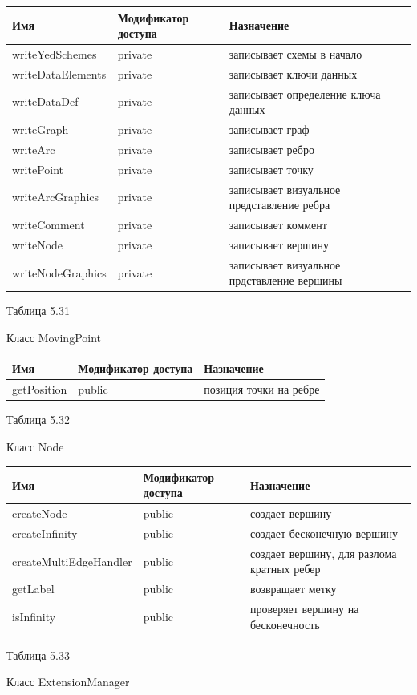 \documentclass{../TechDoc}
\begin{document}
	\begin{tabular}{|p{5cm}|p{5cm}|p{5cm}|}
		\hline
		\textbf{Имя} & \textbf{Модификатор доступа} & \textbf{Назначение} \\
		\hline
		writeYedSchemes& private& записывает схемы в начало\\
		\hline
		writeDataElements& private& записывает ключи данных\\
		\hline
		writeDataDef&private & записывает определение ключа данных \\
		\hline
		writeGraph&private & записывает граф\\
		\hline
		writeArc&private & записывает ребро\\
		\hline
		writePoint& private& записывает точку\\
		\hline
		writeArcGraphics& private& записывает визуальное представление ребра\\
		\hline
		writeComment&private & записывает коммент\\
		\hline
		writeNode& private& записывает вершину\\
		\hline
		writeNodeGraphics& private& записывает визуальное прдставление вершины\\
		
		\hline
	\end{tabular}
	\begin{flushright}
		Таблица 5.31
	\end{flushright}
	Класс MovingPoint
	
	\begin{tabular}{|p{5cm}|p{5cm}|p{5cm}|}
		\hline
		\textbf{Имя} & \textbf{Модификатор доступа} & \textbf{Назначение} \\
		\hline
		getPosition & public & позиция точки на ребре\\
		
		\hline
	\end{tabular}
	\begin{flushright}
		Таблица 5.32
	\end{flushright}
	Класс Node
	
	\begin{tabular}{|p{5cm}|p{5cm}|p{5cm}|}
		\hline
		\textbf{Имя} & \textbf{Модификатор доступа} & \textbf{Назначение} \\
		\hline
		createNode& public& создает вершину\\
		\hline
		createInfinity&public & создает бесконечную вершину\\
		\hline
		createMultiEdgeHandler&public & создает вершину, для разлома кратных ребер\\
		\hline
		getLabel&public & возвращает метку\\
		\hline
		isInfinity& public& проверяет вершину на бесконечность\\
		
		\hline
	\end{tabular}
	\begin{flushright}
		Таблица 5.33
	\end{flushright}
	Класс ExtensionManager
	
\end{document}
